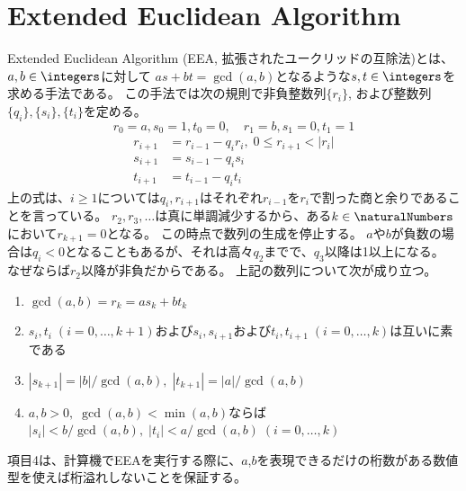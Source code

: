     \section{Extended Euclidean Algorithm}
        Extended Euclidean Algorithm (EEA, 拡張されたユークリッドの互除法)とは、$a,b\in\integers$に対して
        $as + bt = \gcd(a,b)$となるような$s,t\in\integers$を求める手法である。
        この手法では次の規則で非負整数列$\{r_i\}$, および整数列$\{q_i\}, \{s_i\}, \{t_i\}$を定める。
        \[ r_0 = a, s_0 = 1, t_0 = 0,\quad r_1 = b, s_1 = 0, t_1 = 1 \]
        \begin{align*}
            r_{i+1} &= r_{i-1} - q_ir_i,\;0 \leq r_{i+1} < |r_i| \\
            s_{i+1} &= s_{i-1} - q_is_i \\
            t_{i+1} &= t_{i-1} - q_it_i
        \end{align*}
        上の式は、$i\geq 1$については$q_i,r_{i+1}$はそれぞれ$r_{i-1}$を$r_i$で割った商と余りであることを言っている。
        $r_2,r_3,\dotsc$は真に単調減少するから、ある$k\in\naturalNumbers$において$r_{k+1}=0$となる。
        この時点で数列の生成を停止する。
        $a$や$b$が負数の場合は$q_i<0$となることもあるが、それは高々$q_2$までで、$q_3$以降は1以上になる。
        なぜならば$r_2$以降が非負だからである。
        上記の数列について次が成り立つ。
        \begin{enumerate}
            \item $\gcd(a,b) = r_k = as_k + bt_k$
            \item $s_i,t_i\;(i=0,\dotsc,k+1)$および$s_i,s_{i+1}$および$t_i,t_{i+1}\;(i=0,\dotsc,k)$は互いに素である
            \item $|s_{k+1}| = |b|/\gcd(a,b),\;|t_{k+1}| = |a|/\gcd(a,b)$
            \item $a,b>0,\;\gcd(a,b) < \min(a,b)$ならば$|s_i| < b/\gcd(a,b),\;|t_i| < a/\gcd(a,b)\;(i=0,\dotsc,k)$
        \end{enumerate}
        項目4は、計算機でEEAを実行する際に、$a$,$b$を表現できるだけの桁数がある数値型を使えば桁溢れしないことを保証する。
